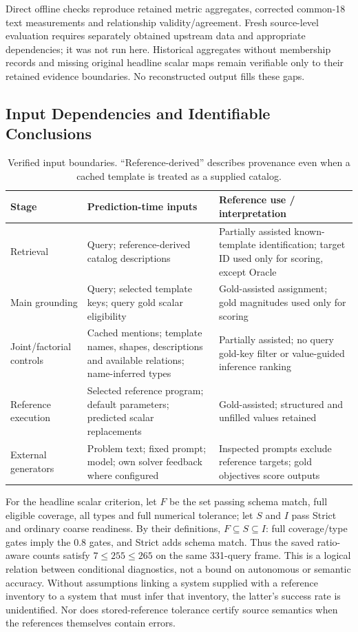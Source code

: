 Direct offline checks reproduce retained metric aggregates, corrected common-18 text measurements and relationship validity/agreement. Fresh source-level evaluation requires separately obtained upstream data and appropriate dependencies; it was not run here. Historical aggregates without membership records and missing original headline scalar maps remain verifiable only to their retained evidence boundaries. No reconstructed output fills these gaps.

\subsection{Input Dependencies and Identifiable Conclusions}
\label{app:input-dependencies}

\begin{table}[htbp]
\centering\small
\caption{Verified input boundaries. ``Reference-derived'' describes
provenance even when a cached template is treated as a supplied catalog.}
\label{tab:input-dependencies}
\begin{tabularx}{\linewidth}{@{}lXX@{}}
\toprule
Stage & Prediction-time inputs & Reference use / interpretation\\
\midrule
Retrieval & Query; reference-derived catalog descriptions & Partially assisted known-template identification; target ID used only for scoring, except Oracle\\
Main grounding & Query; selected template keys; query gold scalar eligibility & Gold-assisted assignment; gold magnitudes used only for scoring\\
Joint/factorial controls & Cached mentions; template names, shapes, descriptions and available relations; name-inferred types & Partially assisted; no query gold-key filter or value-guided inference ranking\\
Reference execution & Selected reference program; default parameters; predicted scalar replacements & Gold-assisted; structured and unfilled values retained\\
External generators & Problem text; fixed prompt; model; own solver feedback where configured & Inspected prompts exclude reference targets; gold objectives score outputs\\
\bottomrule
\end{tabularx}
\end{table}

For the headline scalar criterion, let $F$ be the set passing schema match,
full eligible coverage, all types and full numerical tolerance; let $S$
and $I$ pass Strict and ordinary coarse readiness. By their definitions,
$F\subseteq S\subseteq I$: full coverage/type gates imply the 0.8 gates,
and Strict adds schema match. Thus the saved ratio-aware counts satisfy
$7\leq255\leq265$ on the same 331-query frame. This is a logical relation
between conditional diagnostics, not a bound on autonomous or semantic
accuracy. Without assumptions linking a system supplied with a reference
inventory to a system that must infer that inventory, the latter's success
rate is unidentified. Nor does stored-reference tolerance certify source
semantics when the references themselves contain errors.


